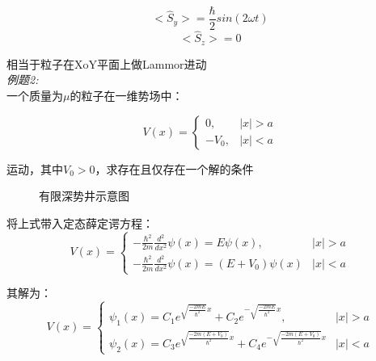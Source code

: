 \documentclass[UTF8]{ctexart}
\begin{document}
\[
    <\hat{S}_y> = \frac{\hbar}{2} sin(2\omega t)
\]
\[<\hat{S}_z> = 0\]

相当于粒子在XoY平面上做Lammor进动\\






\emph{例题2:}\\
一个质量为$\mu$的粒子在一维势场中：

\[
V(x)=
\begin{cases}
0, & |x| > a \\
- V_0, & |x| < a
\end{cases}
\]

运动，其中$V_0>0$，求存在且仅存在一个解的条件

\begin{figure}[htbp]
    \centering
    \caption{有限深势井示意图}
\end{figure}

将上式带入定态薛定谔方程：\\
\[
V(x)=
\begin{cases}
-\frac{\hbar^2}{2m}\frac{d^2}{dx^2}\psi(x) =E \psi(x) , & |x| > a \\
-\frac{\hbar^2}{2m}\frac{d^2}{dx^2}\psi(x) =(E+V_0)\psi(x)& |x| < a
\end{cases}
\]

其解为：
\[
V(x)=
\begin{cases}
\psi_1(x)=C_1e^{\sqrt{\frac{-2mE}{\hbar^2}}x}  + C_2e^{-\sqrt{\frac{-2mE}{\hbar^2}}x}  , & |x| > a \\
\psi_2(x)=C_3e^{\sqrt{\frac{-2m(E+V_0)}{\hbar^2}}x}  + C_4e^{-\sqrt{\frac{-2m(E+V_0)}{\hbar^2}}x} & |x| < a
\end{cases}
\]
\end{document}
